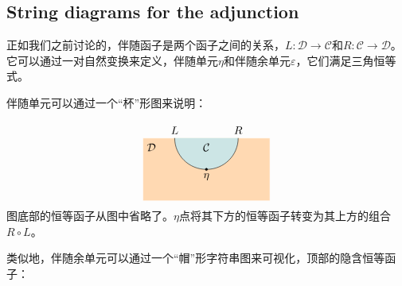 \documentclass[DaoFP]{subfiles}
\begin{document}
    \subsection{String diagrams for the adjunction}

    正如我们之前讨论的，伴随函子是两个函子之间的关系，$L \colon \mathcal{D} \to \mathcal{C}$和$R \colon \mathcal{C} \to \mathcal{D}$。它可以通过一对自然变换来定义，伴随单元$\eta$和伴随余单元$\varepsilon$，它们满足三角恒等式。

    伴随单元可以通过一个“杯”形图来说明：

    \[
        \begin{tikzpicture}

            \def \xrightmost {2}
            \def \xright         {1}
            \def \xmid          {0}
            \def \xleft           {-\xright}
            \def \xleftmost   {-\xrightmost}

            \def \ybot           {0}
            \def \ymid          {1}
            \def \ytop           {2}
            \def \ylabel        {\ytop - 0.3}

            \node [above] at (\xleft, \ytop)   {$L$};
            \node [above] at (\xright, \ytop) {$R$};
            \filldraw[fill=orange!30, draw=white] (\xleftmost, \ytop) rectangle (\xrightmost, \ybot);
            \draw [fill=blue!50!green!20] (\xleft, \ytop) to [out=-90, in=180] (\xmid, \ymid) to [out=0, in=-90] (\xright, \ytop);
            \filldraw [black] (\xmid, \ymid) circle (1 pt);
            \node [below] at (\xmid, \ymid) {$\eta$};
            \node           at (\xmid, \ylabel)        {$\mathcal{C}$};
            \node [right] at (\xleftmost, \ylabel) {$\mathcal{D}$};

        \end{tikzpicture}
    \]
    图底部的恒等函子从图中省略了。$\eta$点将其下方的恒等函子转变为其上方的组合$R \circ L$。

    类似地，伴随余单元可以通过一个“帽”形字符串图来可视化，顶部的隐含恒等函子：
\end{document}
